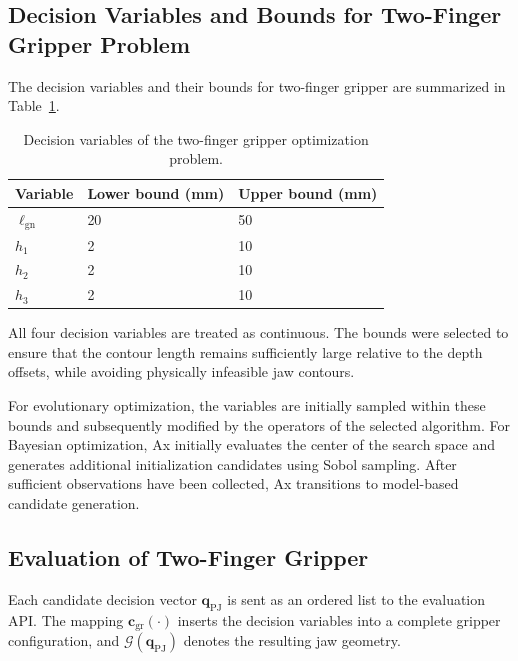 \subsection{Decision Variables and Bounds for Two-Finger Gripper Problem}
\label{sec:two_finger_decision_variables}

The decision variables and their bounds for two-finger gripper are summarized in Table~\ref{tab:two_finger_variables}.

\begin{table}[htbp]
\centering
\caption{Decision variables of the two-finger gripper optimization problem.}
\label{tab:two_finger_variables}
\begin{tabular}{@{}lll@{}}
\toprule
\textbf{Variable} & \textbf{Lower bound (mm)} & \textbf{Upper bound (mm)} \\
\midrule
$\ell_{\mathrm{gn}}$ & 20 & 50 \\
$h_1$                & 2  & 10 \\
$h_2$                & 2  & 10 \\
$h_3$                & 2  & 10 \\
\bottomrule
\end{tabular}
\end{table}


All four decision variables are treated as continuous. The bounds were selected to ensure that the contour length remains sufficiently large relative
to the depth offsets, while avoiding physically infeasible jaw contours.

For evolutionary optimization, the variables are initially sampled within these bounds and
subsequently modified by the operators of the selected algorithm. For Bayesian optimization, Ax
initially evaluates the center of the search space and generates additional initialization
candidates using Sobol sampling. After sufficient observations have been collected, Ax transitions
to model-based candidate generation.

\subsection{Evaluation of Two-Finger Gripper}
\label{sec:two_finger_api_evaluation}

Each candidate decision vector $\mathbf{q}_{\mathrm{PJ}}$ is sent as an
ordered list to the evaluation API.
The mapping $\mathbf{c}_{\mathrm{gr}}(\cdot)$ inserts the decision
variables into a complete gripper configuration, and
$\mathcal{G}(\mathbf{q}_{\mathrm{PJ}})$ denotes the resulting jaw geometry.

